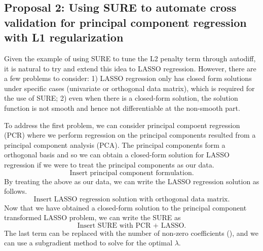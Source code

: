 \pagebreak
\subsection{Proposal 2: Using SURE to automate cross validation for principal component regression with L1 regularization} %
Given the example of using SURE to tune the L2 penalty term through autodiff, it is natural to try and extend this idea to LASSO regression. However, there are a few problems to consider: 1) LASSO regression only has closed form solutions under specific cases (univariate or orthogonal data matrix), which is required for the use of SURE; 2) even when there is a closed-form solution, the solution function is not smooth and hence not differentiable at the non-smooth part. 

To address the first problem, we can consider principal compoent regression (PCR) where we perform regression on the principal components resulted from a principal component analysis (PCA). The principal components form a orthogonal basis and so we can obtain a closed-form solution for LASSO regression if we were to treat the principal components as our data.
\[
\text{Insert principal component formulation.}
\]
By treating the above as our data, we can write the LASSO regression solution as follows.
\[
\text{Insert LASSO regression solution with orthogonal data matrix.}
\]
Now that we have obtained a closed-form solution to the principal component transformed LASSO problem, we can write the SURE as
\[
\text{Insert SURE with PCR + LASSO.}
\]
The last term can be replaced with the number of non-zero coefficients (\citet{tibshirani2015stein}), and we can use a subgradient method to solve for the optimal $\lambda$.
